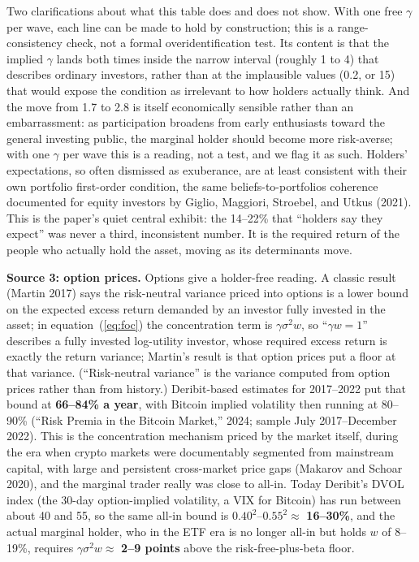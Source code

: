 \documentclass[11pt]{article}
\begin{document}
Two clarifications about what this table does and does not show. With one free $\gamma$ per wave, each line can be made to hold by construction; this is a range-consistency check, not a formal overidentification test. Its content is that the implied $\gamma$ lands both times inside the narrow interval (roughly 1 to 4) that describes ordinary investors, rather than at the implausible values (0.2, or 15) that would expose the condition as irrelevant to how holders actually think. And the move from 1.7 to 2.8 is itself economically sensible rather than an embarrassment: as participation broadens from early enthusiasts toward the general investing public, the marginal holder should become more risk-averse; with one $\gamma$ per wave this is a reading, not a test, and we flag it as such. Holders' expectations, so often dismissed as exuberance, are at least consistent with their own portfolio first-order condition, the same beliefs-to-portfolios coherence documented for equity investors by Giglio, Maggiori, Stroebel, and Utkus (2021). This is the paper's quiet central exhibit: the 14--22\% that ``holders say they expect'' was never a third, inconsistent number. It is the required return of the people who actually hold the asset, moving as its determinants move.

\textbf{Source 3: option prices.} Options give a holder-free reading. A classic result (Martin 2017) says the risk-neutral variance priced into options is a lower bound on the expected excess return demanded by an investor fully invested in the asset; in equation~(\ref{eq:foc}) the concentration term is $\gamma \sigma^2 w$, so ``$\gamma w = 1$'' describes a fully invested log-utility investor, whose required excess return is exactly the return variance; Martin's result is that option prices put a floor at that variance. (``Risk-neutral variance'' is the variance computed from option prices rather than from history.) Deribit-based estimates for 2017--2022 put that bound at \textbf{66--84\% a year}, with Bitcoin implied volatility then running at 80--90\% (``Risk Premia in the Bitcoin Market,'' 2024; sample July 2017--December 2022). This is the concentration mechanism priced by the market itself, during the era when crypto markets were documentably segmented from mainstream capital, with large and persistent cross-market price gaps (Makarov and Schoar 2020), and the marginal trader really was close to all-in. Today Deribit's DVOL index (the 30-day option-implied volatility, a VIX for Bitcoin) has run between about 40 and 55, so the same all-in bound is $0.40^2$--$0.55^2 \approx$ \textbf{16--30\%}, and the actual marginal holder, who in the ETF era is no longer all-in but holds $w$ of 8--19\%, requires $\gamma\sigma^2 w \approx$ \textbf{2--9 points} above the risk-free-plus-beta floor.
\end{document}
